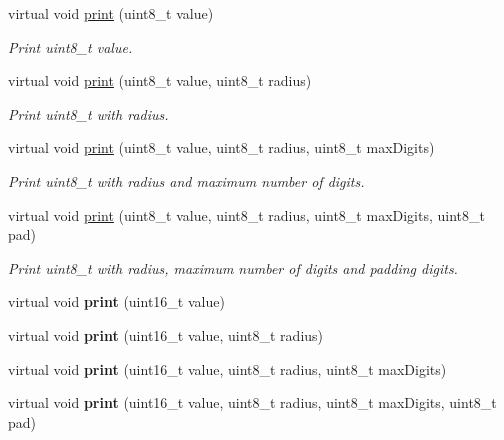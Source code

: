 \begin{DoxyCompactItemize}
virtual void \hyperlink{class_l_k_m1638_board_a02dedfb608775b702d17e4d993006bec}{print} (uint8\+\_\+t value)
\begin{DoxyCompactList}\small\item\em Print uint8\+\_\+t value. \end{DoxyCompactList}\item 
virtual void \hyperlink{class_l_k_m1638_board_a4c2dfa4e41c625419af04b23f67d55c0}{print} (uint8\+\_\+t value, uint8\+\_\+t radius)
\begin{DoxyCompactList}\small\item\em Print uint8\+\_\+t with radius. \end{DoxyCompactList}\item 
virtual void \hyperlink{class_l_k_m1638_board_a162d7463e2a5a61c8d2688a0ccc2469f}{print} (uint8\+\_\+t value, uint8\+\_\+t radius, uint8\+\_\+t max\+Digits)
\begin{DoxyCompactList}\small\item\em Print uint8\+\_\+t with radius and maximum number of digits. \end{DoxyCompactList}\item 
virtual void \hyperlink{class_l_k_m1638_board_ae38bc4ef7ce51c10adbf0a4708ee9f8d}{print} (uint8\+\_\+t value, uint8\+\_\+t radius, uint8\+\_\+t max\+Digits, uint8\+\_\+t pad)
\begin{DoxyCompactList}\small\item\em Print uint8\+\_\+t with radius, maximum number of digits and padding digits. \end{DoxyCompactList}\item 
virtual void {\bfseries print} (uint16\+\_\+t value)\hypertarget{class_l_k_m1638_board_addb92b7db50eae92e3e5a493b2254e32}{}\label{class_l_k_m1638_board_addb92b7db50eae92e3e5a493b2254e32}

\item 
virtual void {\bfseries print} (uint16\+\_\+t value, uint8\+\_\+t radius)\hypertarget{class_l_k_m1638_board_aa23737222e7b89c3788a0b989d875c8e}{}\label{class_l_k_m1638_board_aa23737222e7b89c3788a0b989d875c8e}

\item 
virtual void {\bfseries print} (uint16\+\_\+t value, uint8\+\_\+t radius, uint8\+\_\+t max\+Digits)\hypertarget{class_l_k_m1638_board_a00a327012ce4139379fd7db2b9c18d46}{}\label{class_l_k_m1638_board_a00a327012ce4139379fd7db2b9c18d46}

\item 
virtual void {\bfseries print} (uint16\+\_\+t value, uint8\+\_\+t radius, uint8\+\_\+t max\+Digits, uint8\+\_\+t pad)\hypertarget{class_l_k_m1638_board_ada91bebab1bbf9a0b49c2badbc719a23}{}\label{class_l_k_m1638_board_ada91bebab1bbf9a0b49c2badbc719a23}


\end{DoxyCompactItemize}
